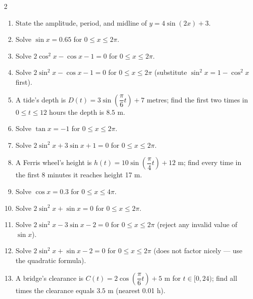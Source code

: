 \documentclass[11pt]{article}
\begin{document}
\begin{recapbox}
\begin{multicols}{2}
\small
\begin{enumerate}[leftmargin=*,itemsep=3pt]
  \item State the amplitude, period, and midline of $y=4\sin(2x)+3$.
  \item Solve $\sin x=0.65$ for $0\leq x\leq2\pi$.
  \item Solve $2\cos^2x-\cos x-1=0$ for $0\leq x\leq2\pi$.
  \item Solve $2\sin^2x-\cos x-1=0$ for $0\leq x\leq2\pi$ (substitute $\sin^2x=1-\cos^2x$ first).
  \item A tide's depth is $D(t)=3\sin\!\left(\dfrac{\pi}{6}t\right)+7$ metres; find the first two times in $0\leq t\leq12$ hours the depth is $8.5$ m.
  \item Solve $\tan x=-1$ for $0\leq x\leq2\pi$.
  \item Solve $2\sin^2x+3\sin x+1=0$ for $0\leq x\leq2\pi$.
  \item A Ferris wheel's height is $h(t)=10\sin\!\left(\dfrac{\pi}{4}t\right)+12$ m; find every time in the first 8 minutes it reaches height 17 m.
  \item Solve $\cos x=0.3$ for $0\leq x\leq4\pi$.
  \item Solve $2\sin^2x+\sin x=0$ for $0\leq x\leq2\pi$.
  \item Solve $2\sin^2x-3\sin x-2=0$ for $0\leq x\leq2\pi$ (reject any invalid value of $\sin x$).
  \item Solve $2\sin^2x+\sin x-2=0$ for $0\leq x\leq2\pi$ (does not factor nicely --- use the quadratic formula).
  \item A bridge's clearance is $C(t)=2\cos\!\left(\dfrac{\pi}6t\right)+5$ m for $t\in[0,24)$; find all times the clearance equals $3.5$ m (nearest 0.01 h).
\end{enumerate}
\end{multicols}
\end{recapbox}
\end{document}
